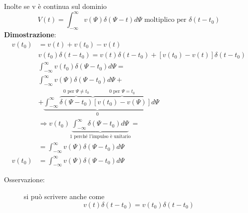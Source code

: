 \documentclass[a4paper, 12pt]{book}
\theoremstyle{plain}
\begin{document}
Inolte se v è continua sul dominio 
\[
    V(t) =   \int_{-\infty}^\infty v(\Psi) \delta(\Psi - t) d\Psi \textrm{ moltiplico per } \delta(t - t_0)
\]
\textbf{Dimostrazione}:  
\[
    \begin{split}
        v(t_0) &= v(t) + v(t_0) - v(t)\\
        &v(t_0) \delta(t- t_0) = v(t) \delta(t - t_0) + [v(t_0) - v(t)] \delta(t - t_0)\\
        &\int_{-\infty}^\infty v(t_0) \delta(\Psi - t_0)d\Psi =\\
        &\int_{-\infty}^\infty v(\Psi) \delta(\Psi - t_0) d\Psi +\\
        &+ \underbrace{\int_{-\infty}^\infty \overbrace{\delta(\Psi - t_0)}^{0 \textrm{ per } \Psi \neq t_0} \overbrace{[v(t_0) - v(\Psi)]}^{0 \textrm{ per } \Psi = t_0}}_0d\Psi\\
        &\Rightarrow v(t_0) \underbrace{\int_{-\infty}^\infty \delta(\Psi - t_0) d\Psi}_{1 \textrm{ perché l'impulso è unitario}} = \\
        &= \int_{-\infty}^\infty v(\Psi) \delta(\Psi - t_0) d\Psi\\
        v(t_0) &= \int_{-\infty}^\infty v(\Psi) \delta(\Psi - t_0) d\Psi
    \end{split}    
\] 
\begin{description}
    \item[Osservazione: ] si può scrivere anche come \[v(t) \delta(t - t_0) = v(t_0) \delta (t - t_0)\] 
\end{description}
\end{document}
